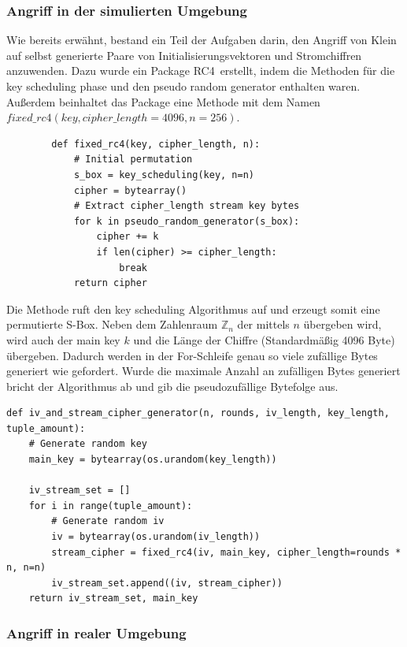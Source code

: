 \documentclass[10pt,a4paper]{article}
\begin{document}
\subsubsection{Angriff in der simulierten Umgebung}
Wie bereits erwähnt, bestand ein Teil der Aufgaben darin, den Angriff von Klein auf selbst generierte Paare von Initialisierungsvektoren und Stromchiffren anzuwenden. Dazu wurde ein Package \glqq RC4\grqq\ erstellt, indem die Methoden für die key scheduling phase und den pseudo random generator enthalten waren. Außerdem beinhaltet das Package eine Methode mit dem Namen $fixed\_rc4(key, cipher\_length=4096, n=256)$.
\begin{lstlisting}
		def fixed_rc4(key, cipher_length, n):
    		# Initial permutation
    		s_box = key_scheduling(key, n=n)
    		cipher = bytearray()
    		# Extract cipher_length stream key bytes
    		for k in pseudo_random_generator(s_box):
        		cipher += k
        		if len(cipher) >= cipher_length:
            		break
    		return cipher
\end{lstlisting}
Die Methode ruft den key scheduling Algorithmus auf und erzeugt somit eine permutierte S-Box. Neben dem Zahlenraum $\mathbb{Z}_n$ der mittels $n$ übergeben wird, wird auch der main key $k$ und die Länge der Chiffre (Standardmäßig 4096 Byte) übergeben. Dadurch werden in der For-Schleife genau so viele zufällige Bytes generiert wie gefordert. Wurde die maximale Anzahl an zufälligen Bytes generiert bricht der Algorithmus ab und gib die pseudozufällige Bytefolge aus.
\begin{lstlisting}
def iv_and_stream_cipher_generator(n, rounds, iv_length, key_length, tuple_amount):
    # Generate random key
    main_key = bytearray(os.urandom(key_length))

    iv_stream_set = []
    for i in range(tuple_amount):
        # Generate random iv
        iv = bytearray(os.urandom(iv_length))
        stream_cipher = fixed_rc4(iv, main_key, cipher_length=rounds * n, n=n)
        iv_stream_set.append((iv, stream_cipher))
    return iv_stream_set, main_key
\end{lstlisting}
\subsubsection{Angriff in realer Umgebung}
\end{document}

